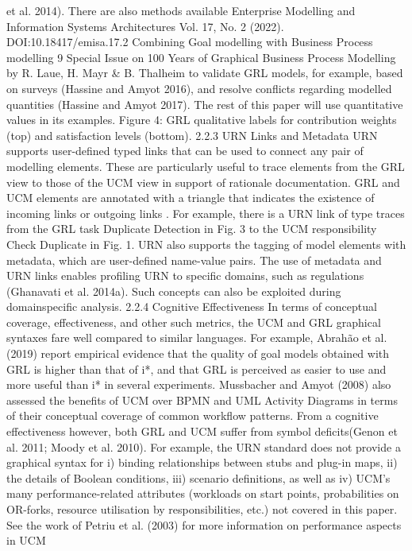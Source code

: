 et al. 2014). There are also methods available
Enterprise Modelling and Information Systems Architectures
Vol. 17, No. 2 (2022). DOI:10.18417/emisa.17.2
Combining Goal modelling with Business Process modelling 9
Special Issue on 100 Years of Graphical Business Process Modelling by R. Laue, H. Mayr & B. Thalheim
to validate GRL models, for example, based on
surveys (Hassine and Amyot 2016), and resolve
conflicts regarding modelled quantities (Hassine
and Amyot 2017). The rest of this paper will use
quantitative values in its examples.
Figure 4: GRL qualitative labels for contribution
weights (top) and satisfaction levels (bottom).
2.2.3 URN Links and Metadata
URN supports user-defined typed links that can be
used to connect any pair of modelling elements.
These are particularly useful to trace elements
from the GRL view to those of the UCM view
in support of rationale documentation. GRL and
UCM elements are annotated with a triangle that
indicates the existence of incoming links or
outgoing links . For example, there is a URN
link of type traces from the GRL task Duplicate
Detection in Fig. 3 to the UCM responsibility
Check Duplicate in Fig. 1.
URN also supports the tagging of model elements with metadata, which are user-defined
name-value pairs. The use of metadata and URN
links enables profiling URN to specific domains,
such as regulations (Ghanavati et al. 2014a). Such
concepts can also be exploited during domainspecific analysis.
2.2.4 Cognitive Effectiveness
In terms of conceptual coverage, effectiveness, and
other such metrics, the UCM and GRL graphical
syntaxes fare well compared to similar languages.
For example, Abrahão et al. (2019) report empirical evidence that the quality of goal models
obtained with GRL is higher than that of i*, and
that GRL is perceived as easier to use and more
useful than i* in several experiments. Mussbacher
and Amyot (2008) also assessed the benefits of
UCM over BPMN and UML Activity Diagrams
in terms of their conceptual coverage of common
workflow patterns.
From a cognitive effectiveness however, both
GRL and UCM suffer from symbol deficits(Genon
et al. 2011; Moody et al. 2010). For example, the
URN standard does not provide a graphical syntax
for i) binding relationships between stubs and
plug-in maps, ii) the details of Boolean conditions,
iii) scenario definitions, as well as iv) UCM’s
many performance-related attributes (workloads
on start points, probabilities on OR-forks, resource
utilisation by responsibilities, etc.) not covered in
this paper. See the work of Petriu et al. (2003) for
more information on performance aspects in UCM
